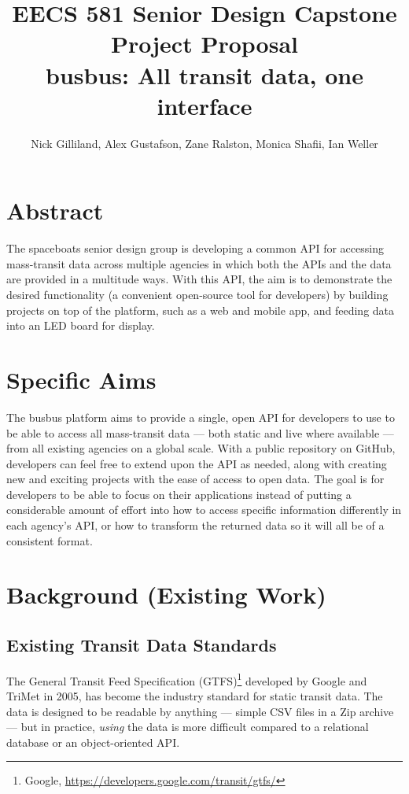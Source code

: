 \documentclass[12pt]{article}
\title{EECS 581 Senior Design Capstone Project Proposal \\
busbus: All transit data, one interface}
\author{Nick Gilliland, Alex Gustafson, Zane Ralston, Monica Shafii, Ian Weller}
\begin{document}
\maketitle

\section{Abstract}

The spaceboats senior design group is developing a common API for accessing mass-transit data
across multiple agencies in which both the APIs and the data are provided in a multitude ways.
With this API, the aim is to demonstrate the desired functionality (a convenient open-source tool 
for developers) by building projects on top of the platform, such as a web and mobile app, and 
feeding data into an LED board for display.

\section{Specific Aims}

The busbus platform aims to provide a single, open API for developers to use to be able to access all
mass-transit data --- both static and live where available --- from all existing agencies on a global scale.
With a public repository on GitHub, developers can feel free to extend upon the API as needed,
along with creating new and exciting projects with the ease of access to open data. The goal is for
developers to be able to focus on their applications instead of putting a considerable amount of
effort into how to access specific information differently in each agency's API, or how to transform
the returned data so it will all be of a consistent format.

\section{Background (Existing Work)}
\subsection{Existing Transit Data Standards}
The General Transit Feed Specification (GTFS)\footnote{Google, \url{https://developers.google.com/transit/gtfs/}}
developed by Google and TriMet in 2005, has become the industry standard for static transit data.
The data is designed to be readable by anything --- simple CSV files in a Zip archive ---
but in practice, \textit{using} the data is more difficult compared to a relational database
or an object-oriented API.
\end{document}
